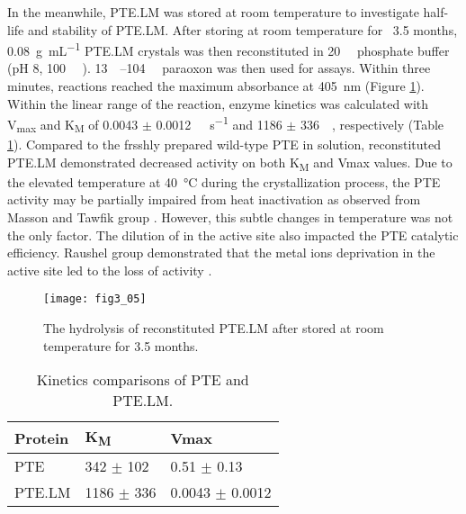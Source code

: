 \begin{refsection}
In the meanwhile, PTE.LM was stored at room temperature to investigate
half-life and stability of PTE.LM.  After storing at room temperature for ~3.5
months, \SI{0.08}{\gram\per\mL} PTE.LM crystals was then reconstituted in
\SI{20}{\milli\Molar} phosphate buffer (pH 8, \SI{100}{\micro\Molar}
). \SIrange{13}{104}{\micro\Molar} paraoxon was then used for assays.
Within three minutes, reactions reached the maximum absorbance at
\SI{405}{\nm} (Figure \ref{fig:ptelm-hydrolysis}). Within the linear range
of the reaction, enzyme kinetics was calculated with V\textsubscript{max} and
K\textsubscript{M} of 0.0043 $\pm$ \SI{0.0012}{\micro\Molar\per\second} and 1186
$\pm$ \SI{336}{\micro\Molar}, respectively (Table \ref{tab:ptelm-table}).
Compared to the frsshly prepared wild-type PTE in solution, reconstituted
PTE.LM demonstrated decreased activity on both K\textsubscript{M} and Vmax
values. Due to the elevated temperature at \SI{40}{\celsius} during the
crystallization process, the PTE activity may be partially impaired from heat
inactivation as observed from Masson and Tawfik group
\cite{Rochu2002b,Roodveldt2005}. However, this subtle changes in temperature
was not the only factor. The dilution of  in the active site also
impacted the PTE catalytic efficiency. Raushel group demonstrated that the
metal ions deprivation in the active site led to the loss of activity
\cite{Benning1995,Samples2005}. 
\begin{figure}[htbp] \centering \texttt{[image: fig3\_05]} 
    \caption[The hydrolysis of reconstituted PTE.LM after stored at room
    temperature for 3.5 months.]{The hydrolysis of reconstituted PTE.LM after
    stored at room temperature for 3.5 months.} \label{fig:ptelm-hydrolysis} 
\end{figure}

\begin{table}[h!]
    \centering
    \begin{tabular}{ lll }
        \hline
        Protein & K\textsubscript{M} & Vmax \\
        \hline
        PTE & 342 $\pm$ 102 & 0.51 $\pm$ 0.13 \\
        PTE.LM & 1186 $\pm$ 336 & 0.0043 $\pm$ 0.0012 \\
        \hline
    \end{tabular}
    \caption[Kinetics comparisons of PTE and PTE.LM.]{Kinetics comparisons of PTE and PTE.LM.} 
    \label{tab:ptelm-table} 
\end{table}


\end{refsection}
